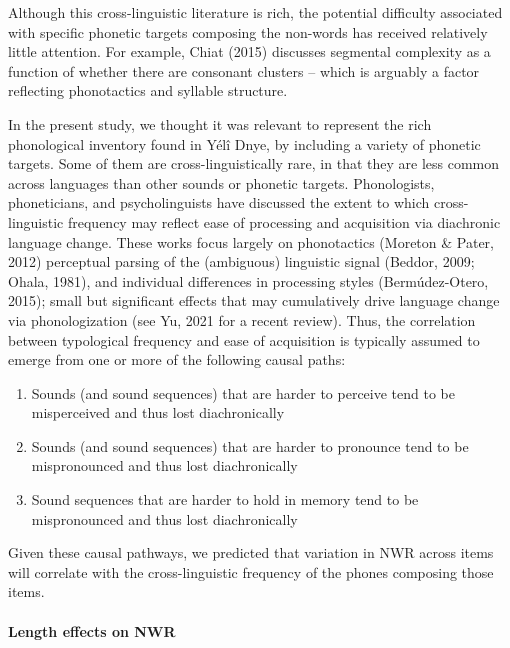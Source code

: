 \documentclass[
  american,
  ,man,floatsintext]{apa6}
\providecommand{\tightlist}{%
  \setlength{\itemsep}{0pt}\setlength{\parskip}{0pt}}
\let\oldparagraph\paragraph
\renewcommand{\paragraph}[1]{\oldparagraph{#1}\mbox{}}
\begin{document}
Although this cross-linguistic literature is rich, the potential difficulty associated with specific phonetic targets composing the non-words has received relatively little attention. For example, Chiat (2015) discusses segmental complexity as a function of whether there are consonant clusters -- which is arguably a factor reflecting phonotactics and syllable structure.

In the present study, we thought it was relevant to represent the rich phonological inventory found in Yélî Dnye, by including a variety of phonetic targets. Some of them are cross-linguistically rare, in that they are less common across languages than other sounds or phonetic targets. Phonologists, phoneticians, and psycholinguists have discussed the extent to which cross-linguistic frequency may reflect ease of processing and acquisition via diachronic language change. These works focus largely on phonotactics (Moreton \& Pater, 2012) perceptual parsing of the (ambiguous) linguistic signal (Beddor, 2009; Ohala, 1981), and individual differences in processing styles (Bermúdez-Otero, 2015); small but significant effects that may cumulatively drive language change via phonologization (see Yu, 2021 for a recent review). Thus, the correlation between typological frequency and ease of acquisition is typically assumed to emerge from one or more of the following causal paths:

\begin{enumerate}
\def\labelenumi{\arabic{enumi}.}
\tightlist
\item
  Sounds (and sound sequences) that are harder to perceive tend to be misperceived and thus lost diachronically
\item
  Sounds (and sound sequences) that are harder to pronounce tend to be mispronounced and thus lost diachronically
\item
  Sound sequences that are harder to hold in memory tend to be mispronounced and thus lost diachronically
\end{enumerate}

Given these causal pathways, we predicted that variation in NWR across items will correlate with the cross-linguistic frequency of the phones composing those items.

\hypertarget{length-effects-on-nwr}{%
\paragraph{Length effects on NWR}\label{length-effects-on-nwr}}
\end{document}
